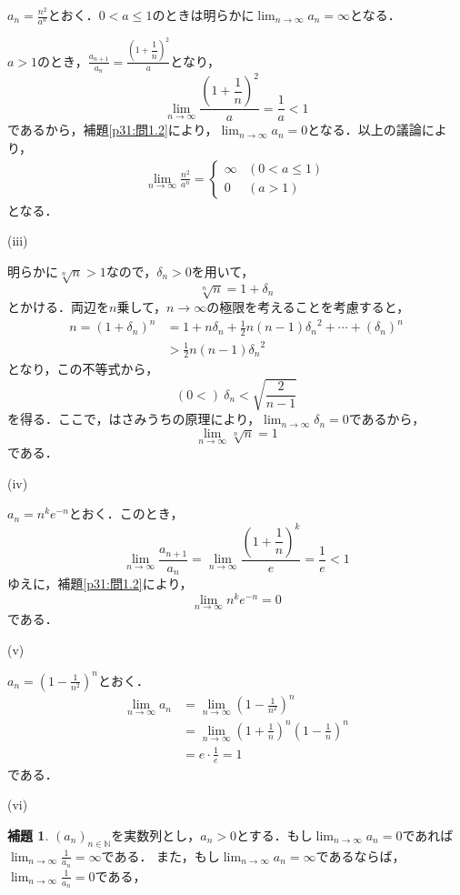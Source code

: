 \documentclass[dvipdfmx,uplatex,11pt]{jsarticle}
\theoremstyle{definition}
\newtheorem{lemm}{補題}[section]
\begin{document}
%
\begin{leftbar}
        $a_n = \frac{n^2}{a^n}$とおく．$0<a \le 1$のときは明らかに$\lim_{n \to \infty} a_n=\infty$となる．\par 
        $a>1$のとき，$\frac{a_{n+1}}{a_n} =\frac{\left(1+\dfrac{1}{n}\right)^2}{a}$となり，
        \[
            \lim_{n \to \infty} \frac{\left(1+\dfrac{1}{n}\right)^2}{a} = \frac{1}{a} <1
        \]
        であるから，補題\ref{p31:問1.2}により，$\lim_{n \to \infty} a_n =0$となる．以上の議論により，
        \begin{align*}
            \lim_{n \to \infty} \frac{n^2}{a^n}
            =
            \begin{cases}
                \infty & (0<a \le 1) \\
                0 & (a>1)
            \end{cases}
        \end{align*}
        となる．
	\end{leftbar}
	\newpage
	(iii)
\begin{leftbar}
    明らかに$\sqrt[n]{n} >1$なので，$\delta_n >0$を用いて，
    \[
        \sqrt[n]{n} = 1+ \delta_n
    \]
    とかける．両辺を$n$乗して，$n \to \infty$の極限を考えることを考慮すると，
    \begin{align*}
        n = (1+\delta_n)^n &=1 + n \delta_n + \frac{1}{2}n(n-1) {\delta_n}^2 + \cdots + (\delta_n)^n \\
        & > \frac{1}{2}n(n-1) {\delta_n}^2
    \end{align*}
    となり，この不等式から，
    \[
        (0<) ~\delta_n < \sqrt{\frac{2}{n-1}}
    \]
    を得る．ここで，はさみうちの原理により，$\lim_{n \to \infty} \delta_n =0$であるから，
    \[
        \lim_{n \to \infty} \sqrt[n]{n} =1
    \]
    である．
\end{leftbar}
\newpage
(iv)
\begin{leftbar}
      $a_n= n^k e^{-n}$とおく．このとき，
      \[
          \lim_{n \to \infty} \frac{a_{n+1}}{a_n} =  \lim_{n \to \infty} \frac{\left(1+\dfrac{1}{n}\right)^k}{e} =\frac{1}{e} <1
      \]
      ゆえに，補題\ref{p31:問1.2}により，
      \[
        \lim_{n \to \infty} n^k e^{-n}=0
      \]
      である．
\end{leftbar}
\newpage
(v)
\begin{leftbar}
      $a_n =\left (1-\frac{1}{n^2}\right)^n$とおく．
      \begin{align*}
        \lim_{n \to \infty} a_n & =\lim_{n \to \infty} \left (1-\frac{1}{n^2}\right)^n \\
        & = \lim_{n \to \infty} \left (1+\frac{1}{n}\right)^n \left (1-\frac{1}{n}\right)^n \\
        & = e \cdot \frac{1}{e} =1
      \end{align*}
      である．
\end{leftbar}
\newpage
(vi)
\begin{lemm}
    \label{p31:問1.6.1}
    $(a_n)_{n \in \mathbb{N}}$を実数列とし，$a_n > 0$とする．もし$\lim_{n \to \infty} a_n =0$であれば$\lim_{n \to \infty} \frac{1}{a_n}=\infty$である．
    また，もし$\lim_{n \to \infty} a_n =\infty$であるならば，$\lim_{n \to \infty} \frac{1}{a_n} =0$である，
\end{lemm}
\end{document}
